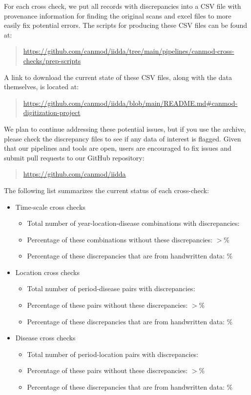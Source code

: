 \documentclass[12pt]{article}
\begin{document}
For each cross check, we put all records with discrepancies into a CSV file with provenance information for finding the original scans and excel files to more easily fix potential errors. The scripts for producing these CSV files can be found at:
\begin{quote}
  \url{https://github.com/canmod/iidda/tree/main/pipelines/canmod-cross-checks/prep-scripts}
\end{quote}
A link to download the current state of these CSV files, along with the data themselves, is located at:
\begin{quote} 
  \url{https://github.com/canmod/iidda/blob/main/README.md#canmod-digitization-project}
\end{quote}
We plan to continue addressing these potential issues, but if you use the archive, please check the discrepancy files to see if any data of interest is flagged. Given that our pipelines and tools are open, users are encouraged to fix issues and submit pull requests to our GitHub repository:
\begin{quote}
  \url{https://github.com/canmod/iidda}
\end{quote}
The following list summarizes the current status of each cross-check:
\begin{itemize}
  \item Time-scale cross checks
  \begin{itemize}
    \item Total number of year-location-disease combinations with discrepancies: 
    \item Percentage of these combinations without these discrepancies: $>$\%
    \item Percentage of these discrepancies that are from handwritten data: \%
  \end{itemize}
  \item Location cross checks
  \begin{itemize}
    \item Total number of period-disease pairs with discrepancies: 
    \item Percentage of these pairs without these discrepancies: $>$\%
    \item Percentage of these discrepancies that are from handwritten data: \%
  \end{itemize}
  \item Disease cross checks
  \begin{itemize}
    \item Total number of period-location pairs with discrepancies: 
    \item Percentage of these pairs without these discrepancies: $>$\%
    \item Percentage of these discrepancies that are from handwritten data: \%
  \end{itemize}
\end{itemize}
\end{document}
